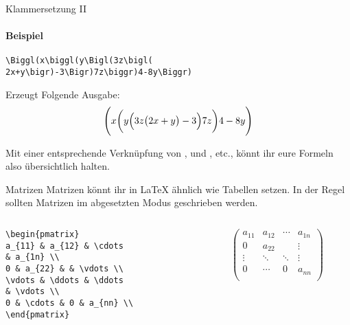 \begin{frame}[fragile]{Klammersetzung II}
\framesubtitle{Beispiel}
\begin{codeblock}
\begin{verbatim}
\Biggl(x\biggl(y\Bigl(3z\bigl(
2x+y\bigr)-3\Bigr)7z\biggr)4-8y\Biggr)
\end{verbatim}
\end{codeblock}
Erzeugt Folgende Ausgabe: 
\[
    \Biggl(x\biggl(y\Bigl(3z\bigl(2x+y\bigr)-3\Bigr)7z\biggr)4-8y\Biggr)
\]\pause

Mit einer entsprechende Verknüpfung von , und , etc., könnt ihr eure Formeln also übersichtlich halten. 
\end{frame}

\begin{frame}[fragile]{Matrizen}
Matrizen könnt ihr in \LaTeX{} ähnlich wie Tabellen setzen. In der Regel sollten Matrizen im abgesetzten Modus geschrieben werden. 
\begin{columns}
\begin{column}{0.55\textwidth}
\begin{codeblock}
\begin{verbatim}
\begin{pmatrix}
a_{11} & a_{12} & \cdots 
& a_{1n} \\
0 & a_{22} & & \vdots \\
\vdots & \ddots & \ddots 
& \vdots \\
0 & \cdots & 0 & a_{nn} \\
\end{pmatrix}
\end{verbatim}
\end{codeblock}
\end{column}
\begin{column}{0.35\textwidth}
\[
\begin{pmatrix}
a_{11} & a_{12} & \cdots & a_{1n} \\
0 & a_{22} & & \vdots \\
\vdots & \ddots & \ddots & \vdots \\
0 & \cdots & 0 & a_{nn} \\
\end{pmatrix}
\]
\end{column}
\end{columns}\pause
\end{frame}

